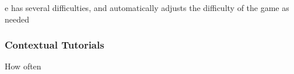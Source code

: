 e has several difficulties, and automatically adjusts the difficulty of the game as needed\subsubsection{Contextual Tutorials}How often 
